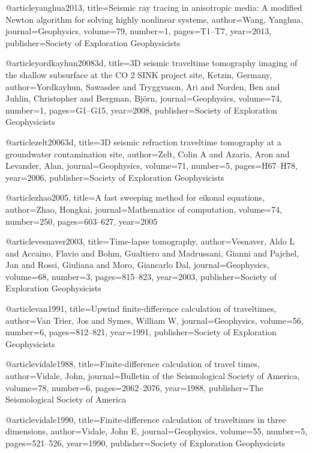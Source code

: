 @article{yanghua2013,
  title={Seismic ray tracing in anisotropic media: A modified Newton algorithm for solving highly nonlinear systems},
  author={Wang, Yanghua},
  journal={Geophysics},
  volume={79},
  number={1},
  pages={T1--T7},
  year={2013},
  publisher={Society of Exploration Geophysicists}
}

@article{yordkayhun20083d,
  title={3{D} seismic traveltime tomography imaging of the shallow subsurface at the CO 2 SINK project site, Ketzin, Germany},
  author={Yordkayhun, Sawasdee and Tryggvason, Ari and Norden, Ben and Juhlin, Christopher and Bergman, Bj{\"o}rn},
  journal={Geophysics},
  volume={74},
  number={1},
  pages={G1--G15},
  year={2008},
  publisher={Society of Exploration Geophysicists}
}

@article{zelt20063d,
  title={3{D} seismic refraction traveltime tomography at a groundwater contamination site},
  author={Zelt, Colin A and Azaria, Aron and Levander, Alan},
  journal={Geophysics},
  volume={71},
  number={5},
  pages={H67--H78},
  year={2006},
  publisher={Society of Exploration Geophysicists}
}

@article{zhao2005,
  title={A fast sweeping method for eikonal equations},
  author={Zhao, Hongkai},
  journal={Mathematics of computation},
  volume={74},
  number={250},
  pages={603--627},
  year={2005}
}


@article{vesnaver2003,
  title={Time-lapse tomography},
  author={Vesnaver, Aldo L and Accaino, Flavio and Bohm, Gualtiero and Madrussani, Gianni and Pajchel, Jan and Rossi, Giuliana and Moro, Giancarlo Dal},
  journal={Geophysics},
  volume={68},
  number={3},
  pages={815--823},
  year={2003},
  publisher={Society of Exploration Geophysicists}
}

@article{van1991,
  title={Upwind finite-difference calculation of traveltimes},
  author={Van Trier, Jos and Symes, William W},
  journal={Geophysics},
  volume={56},
  number={6},
  pages={812--821},
  year={1991},
  publisher={Society of Exploration Geophysicists}
}

@article{vidale1988,
  title={Finite-difference calculation of travel times},
  author={Vidale, John},
  journal={Bulletin of the Seismological Society of America},
  volume={78},
  number={6},
  pages={2062--2076},
  year={1988},
  publisher={The Seismological Society of America}
}

@article{vidale1990,
  title={Finite-difference calculation of traveltimes in three dimensions},
  author={Vidale, John E},
  journal={Geophysics},
  volume={55},
  number={5},
  pages={521--526},
  year={1990},
  publisher={Society of Exploration Geophysicists}
}


